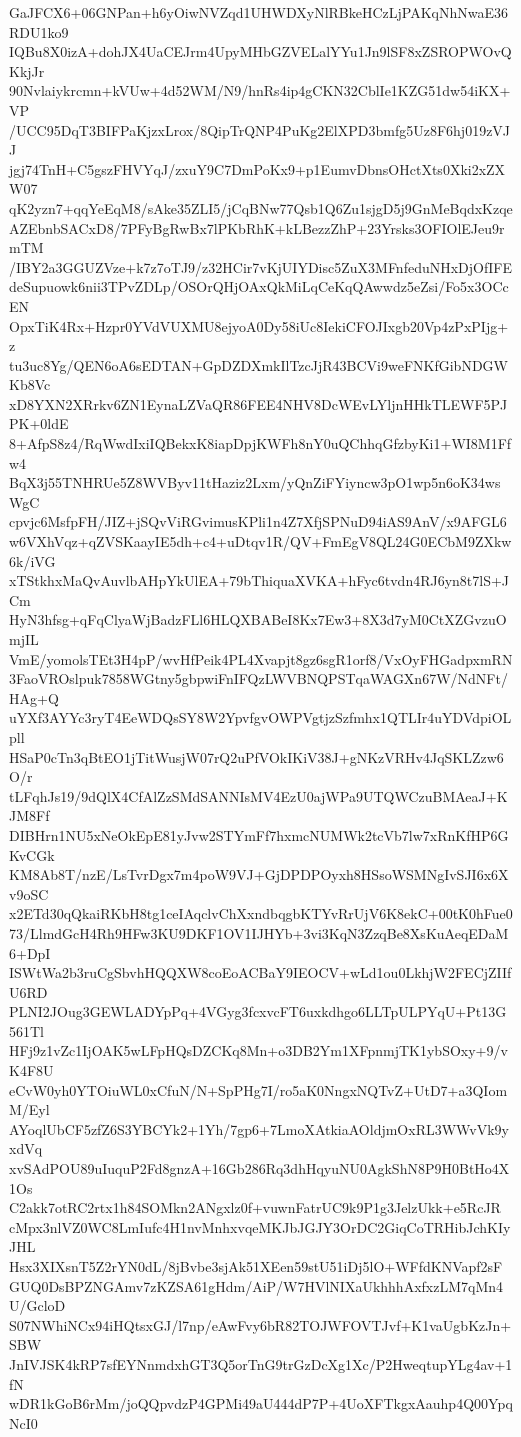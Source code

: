 GaJFCX6+06GNPan+h6yOiwNVZqd1UHWDXyNlRBkeHCzLjPAKqNhNwaE36RDU1ko9
IQBu8X0izA+dohJX4UaCEJrm4UpyMHbGZVELalYYu1Jn9lSF8xZSROPWOvQKkjJr
90Nvlaiykrcmn+kVUw+4d52WM/N9/hnRs4ip4gCKN32CblIe1KZG51dw54iKX+VP
/UCC95DqT3BIFPaKjzxLrox/8QipTrQNP4PuKg2ElXPD3bmfg5Uz8F6hj019zVJJ
jgj74TnH+C5gszFHVYqJ/zxuY9C7DmPoKx9+p1EumvDbnsOHctXts0Xki2xZXW07
qK2yzn7+qqYeEqM8/sAke35ZLI5/jCqBNw77Qsb1Q6Zu1sjgD5j9GnMeBqdxKzqe
AZEbnbSACxD8/7PFyBgRwBx7lPKbRhK+kLBezzZhP+23Yrsks3OFIOlEJeu9rmTM
/IBY2a3GGUZVze+k7z7oTJ9/z32HCir7vKjUIYDisc5ZuX3MFnfeduNHxDjOfIFE
deSupuowk6nii3TPvZDLp/OSOrQHjOAxQkMiLqCeKqQAwwdz5eZsi/Fo5x3OCcEN
OpxTiK4Rx+Hzpr0YVdVUXMU8ejyoA0Dy58iUc8IekiCFOJIxgb20Vp4zPxPIjg+z
tu3uc8Yg/QEN6oA6sEDTAN+GpDZDXmkIlTzcJjR43BCVi9weFNKfGibNDGWKb8Vc
xD8YXN2XRrkv6ZN1EynaLZVaQR86FEE4NHV8DcWEvLYljnHHkTLEWF5PJPK+0ldE
8+AfpS8z4/RqWwdIxiIQBekxK8iapDpjKWFh8nY0uQChhqGfzbyKi1+WI8M1Ffw4
BqX3j55TNHRUe5Z8WVByv11tHaziz2Lxm/yQnZiFYiyncw3pO1wp5n6oK34wsWgC
cpvjc6MsfpFH/JIZ+jSQvViRGvimusKPli1n4Z7XfjSPNuD94iAS9AnV/x9AFGL6
w6VXhVqz+qZVSKaayIE5dh+c4+uDtqv1R/QV+FmEgV8QL24G0ECbM9ZXkw6k/iVG
xTStkhxMaQvAuvlbAHpYkUlEA+79bThiquaXVKA+hFyc6tvdn4RJ6yn8t7lS+JCm
HyN3hfsg+qFqClyaWjBadzFLl6HLQXBABeI8Kx7Ew3+8X3d7yM0CtXZGvzuOmjIL
VmE/yomolsTEt3H4pP/wvHfPeik4PL4Xvapjt8gz6sgR1orf8/VxOyFHGadpxmRN
3FaoVROslpuk7858WGtny5gbpwiFnIFQzLWVBNQPSTqaWAGXn67W/NdNFt/HAg+Q
uYXf3AYYc3ryT4EeWDQsSY8W2YpvfgvOWPVgtjzSzfmhx1QTLIr4uYDVdpiOLpll
HSaP0cTn3qBtEO1jTitWusjW07rQ2uPfVOkIKiV38J+gNKzVRHv4JqSKLZzw6O/r
tLFqhJs19/9dQlX4CfAlZzSMdSANNIsMV4EzU0ajWPa9UTQWCzuBMAeaJ+KJM8Ff
DIBHrn1NU5xNeOkEpE81yJvw2STYmFf7hxmcNUMWk2tcVb7lw7xRnKfHP6GKvCGk
KM8Ab8T/nzE/LsTvrDgx7m4poW9VJ+GjDPDPOyxh8HSsoWSMNgIvSJI6x6Xv9oSC
x2ETd30qQkaiRKbH8tg1ceIAqclvChXxndbqgbKTYvRrUjV6K8ekC+00tK0hFue0
73/LlmdGcH4Rh9HFw3KU9DKF1OV1IJHYb+3vi3KqN3ZzqBe8XsKuAeqEDaM6+DpI
ISWtWa2b3ruCgSbvhHQQXW8coEoACBaY9IEOCV+wLd1ou0LkhjW2FECjZIIfU6RD
PLNI2JOug3GEWLADYpPq+4VGyg3fcxvcFT6uxkdhgo6LLTpULPYqU+Pt13G561Tl
HFj9z1vZc1IjOAK5wLFpHQsDZCKq8Mn+o3DB2Ym1XFpnmjTK1ybSOxy+9/vK4F8U
eCvW0yh0YTOiuWL0xCfuN/N+SpPHg7I/ro5aK0NngxNQTvZ+UtD7+a3QIomM/Eyl
AYoqlUbCF5zfZ6S3YBCYk2+1Yh/7gp6+7LmoXAtkiaAOldjmOxRL3WWvVk9yxdVq
xvSAdPOU89uIuquP2Fd8gnzA+16Gb286Rq3dhHqyuNU0AgkShN8P9H0BtHo4X1Os
C2akk7otRC2rtx1h84SOMkn2ANgxlz0f+vuwnFatrUC9k9P1g3JelzUkk+e5RcJR
cMpx3nlVZ0WC8LmIufc4H1nvMnhxvqeMKJbJGJY3OrDC2GiqCoTRHibJchKIyJHL
Hsx3XIXsnT5Z2rYN0dL/8jBvbe3sjAk51XEen59stU51iDj5lO+WFfdKNVapf2sF
GUQ0DsBPZNGAmv7zKZSA61gHdm/AiP/W7HVlNIXaUkhhhAxfxzLM7qMn4U/GcloD
S07NWhiNCx94iHQtsxGJ/l7np/eAwFvy6bR82TOJWFOVTJvf+K1vaUgbKzJn+SBW
JnIVJSK4kRP7sfEYNnmdxhGT3Q5orTnG9trGzDcXg1Xc/P2HweqtupYLg4av+1fN
wDR1kGoB6rMm/joQQpvdzP4GPMi49aU444dP7P+4UoXFTkgxAauhp4Q00YpqNcI0
